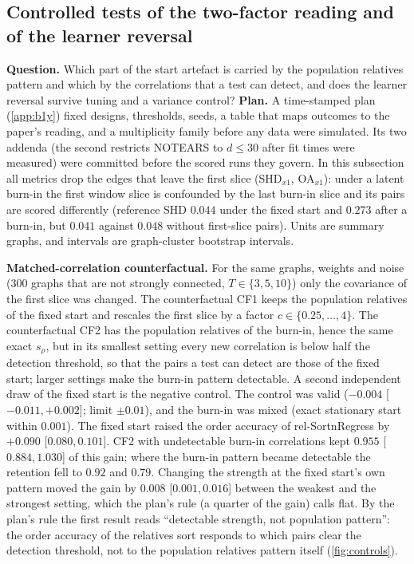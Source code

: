 \documentclass[pdflatex,sn-apa]{sn-jnl}
\theoremstyle{thmstyleone}
\theoremstyle{thmstylethree}
\theoremstyle{thmstyletwo}
\newcommand{\srho}{s_\rho}
\begin{document}
\subsection{Controlled tests of the two-factor reading and of the learner reversal}
\label{sec:controls}

\textbf{Question.} Which part of the start artefact is carried by the
population relatives pattern and which by the correlations that a test can
detect, and does the learner reversal survive tuning and a variance control?
\textbf{Plan.} A time-stamped plan (\cref{app:b1y}) fixed designs, thresholds,
seeds, a table that maps outcomes to the paper's reading, and a multiplicity
family before any data were simulated. Its two addenda (the second restricts
NOTEARS to $d\le30$ after fit times were measured) were committed before the
scored runs they govern. In this subsection all metrics drop the edges that
leave the first slice (SHD$_{x1}$, OA$_{x1}$): under a latent burn-in the first
window slice is confounded by the last burn-in slice and its pairs are scored
differently (reference SHD $0.044$ under the fixed start and $0.273$ after a
burn-in, but $0.041$ against $0.048$ without first-slice pairs). Units are
summary graphs, and intervals are graph-cluster bootstrap intervals.

\textbf{Matched-correlation counterfactual.} For the same graphs, weights and
noise (300 graphs that are not strongly connected, $T\in\{3,5,10\}$) only the
covariance of the first slice was changed. The counterfactual CF1 keeps the
population relatives of the fixed start and rescales the first slice by a
factor $c\in\{0.25,\dots,4\}$. The counterfactual CF2 has the population
relatives of the burn-in, hence the same exact $\srho$, but in its smallest
setting every new correlation is below half the detection threshold, so that
the pairs a test can detect are those of the fixed start; larger settings make
the burn-in pattern detectable. A second independent draw of the fixed start is
the negative control. The control was valid ($-0.004$ [$-0.011,+0.002$]; limit
$\pm0.01$), and the burn-in was mixed (exact stationary start within $0.001$).
The fixed start raised the order accuracy of rel-SortnRegress by $+0.090$
[$0.080,0.101$]. CF2 with undetectable burn-in correlations kept $0.955$
[$0.884,1.030$] of this gain; where the burn-in pattern became detectable the
retention fell to $0.92$ and $0.79$. Changing the strength at the fixed start's
own pattern moved the gain by $0.008$ [$0.001,0.016$] between the weakest and
the strongest setting, which the plan's rule (a quarter of the gain) calls
flat. By the plan's rule the first result reads ``detectable strength, not
population pattern'': the order accuracy of the relatives sort responds to
which pairs clear the detection threshold, not to the population relatives
pattern itself (\cref{fig:controls}).
\end{document}
